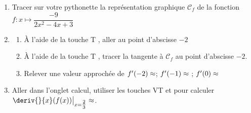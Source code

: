 \documentclass[main.tex]{subfiles}
\begin{document}
\begin{exercise}    \hfill 
	\begin{enumerate}[leftmargin=*,label=\arabic*)]
		\item Tracer sur votre pythonette la représentation graphique $\mathscr{C}_f$ de la fonction $f\colon  x\mapsto \dfrac{-9}{2x^2-4x+3}$ 
		\item \begin{enumerate}[leftmargin=*,label={}]
				\item À l'aide de la touche {\large T} , aller au point d'abscisse $-2$
				\item À l'aide de la touche {\large T} , tracer la tangente à $\mathscr{C}_f$ au point d'abscisse $-2$.  
				\item Relever une valeur approchée de $f'(-2)\approx\dotfill $; $f'(-1)\approx\dotfill $ ; $f'(0)\approx\dotfill $ 
		\end{enumerate}
		\item Aller dans l'onglet calcul, utiliser les touches {\large VT} et pour calculer $\deriv{}{x}(f(x))\big|_{x=\tfrac{2}{3}}\approx\dotfill $.
	\end{enumerate}
\end{exercise}
%	 
\newpage 
{}  
\pagestyle{scrheadings} %
\onehalfspacing
\end{document}
